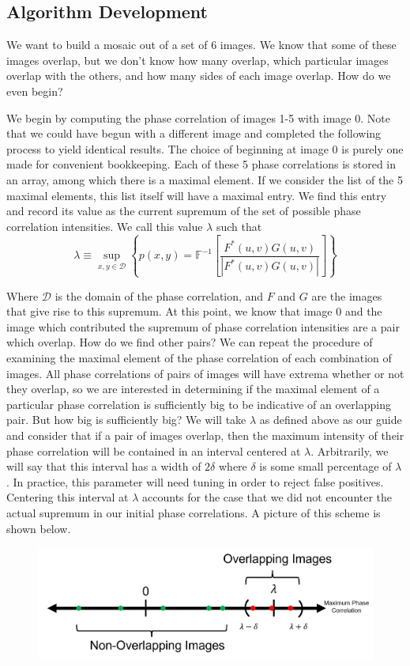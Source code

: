 \documentclass[]{article}
\begin{document}
\subsection{Algorithm Development}
We want to build a mosaic out of a set of 6 images. We know that some of these images overlap, but we don't know how many overlap, which particular images overlap with the others, and how many sides of each image overlap. How do we even begin?

We begin by computing the phase correlation of images 1-5 with image 0. Note that we could have begun with a different image and completed the following process to yield identical results. The choice of beginning at image 0 is purely one made for convenient bookkeeping. Each of these 5 phase correlations is stored in an array, among which there is a maximal element. If we consider the list of the 5 maximal elements, this list itself will have a maximal entry. We find this entry and record its value as the current supremum of the set of possible phase correlation intensities. We call this value $\lambda$ such that 
\[\lambda \equiv \sup_{x,y \in \mathcal{D}} \left\{p(x, y)=\mathbb{F}^{-1}\left[\frac{F^{*}(u, v) G(u, v)}{\left|F^{*}(u, v) G(u, v)\right|}\right]\right\}\] 

Where $\mathcal{D}$ is the domain of the phase correlation, and $F$ and $G$ are the images that give rise to this supremum. At this point, we know that image 0 and the image which contributed the supremum of phase correlation intensities are a pair which overlap. How do we find other pairs? We can repeat the procedure of examining the maximal element of the phase correlation of each combination of images. All phase correlations of pairs of images will have extrema whether or not they overlap, so we are interested in determining if the maximal element of a particular phase correlation is sufficiently big to be indicative of an overlapping pair. But how big is sufficiently big? We will take $\lambda$ as defined above as our guide and consider that if a pair of images overlap, then the maximum intensity of their phase correlation will be contained in an interval centered at $\lambda$. Arbitrarily, we will say that this interval has a width of $2\delta$ where $\delta$ is some small percentage of $\lambda$. In practice, this parameter will need tuning in order to reject false positives. Centering this interval at $\lambda$ accounts for the case that we did not encounter the actual supremum in our initial phase correlations. A picture of this scheme is shown below.

\begin{figure}[H]
	\centering
	\includegraphics[width=6in]{overlap.png}
\end{figure}
\end{document}
